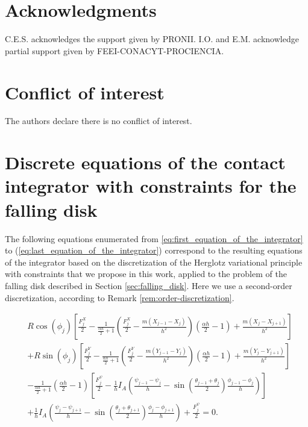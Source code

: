 \documentclass{aims}
\numberwithin{equation}{section}
\theoremstyle{definition}
\begin{document}
\section*{Acknowledgments}

C.E.S. acknowledges the support given by PRONII. I.O. and E.M. acknowledge partial support given by  FEEI-CONACYT-PROCIENCIA.

\section*{Conflict of interest}

The authors declare there is no conflict of interest.


\clearpage




\appendix
\section{Discrete equations of the contact integrator with constraints for the falling disk}\label{App:Integrator-equations}

The following equations enumerated from \eqref{eq:first_equation_of_the_integrator} to (\ref{eq:last_equation_of_the_integrator}) correspond to the resulting equations of the integrator based on the discretization of the Herglotz variational principle with constraints that we propose in this work, applied to the problem of the falling disk described in Section \ref{sec:falling_disk}. Here we use a second-order discretization, according to Remark \ref{rem:order-discretization}.
\small

\begin{equation}\label{eq:first_equation_of_the_integrator}
    \begin{split}
      &R \cos(\phi_j) \left[\frac{F^X_j}{2} - \frac{1}{\frac{\alpha h}{2} + 1} \left(\frac{F^X_j}{2} - \frac{m (X_{j-1} - X_j)}{h^2}\right) \left(\frac{\alpha h}{2} - 1\right) + \frac{m (X_j - X_{j+1})}{h^2} \right] \\
  &+ R \sin(\phi_j) \left[ \frac{F^Y_j}{2} - \frac{1}{\frac{\alpha h}{2} + 1} \left(\frac{F^Y_j}{2} - \frac{m (Y_{j-1} - Y_j)}{h^2}\right) \left(\frac{\alpha h}{2} - 1\right) + 
  \frac{m (Y_j - Y_{j+1})}{h^2} \right]\\
  &-\frac{1}{\frac{\alpha h}{2} + 1}
  \left(\frac{\alpha h}{2} - 1\right) 
  \left[\frac{F^{\psi}_j}{2} - \frac{1}{h} I_A \left( \frac{\psi_{j-1} - \psi_j}{h} - \sin\left(\frac{\theta_{j-1} + \theta_j}{2}\right) \frac{\phi_{j-1} - \phi_j}{h}\right)\right] \\
  &+\frac{1}{h} I_A \left( \frac{\psi_j - \psi_{j+1}}{h} - 
  \sin\left(\frac{\theta_j + \theta_{j+1}}{2}\right) 
  \frac{\phi_j - \phi_{j+1}}{h} \right) +\frac{F^{\psi}_j}{2}= 0.
    \end{split}
\end{equation}
\end{document}
